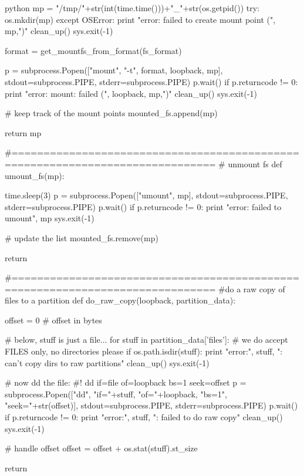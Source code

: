 \begin{code-block}{python}
    mp = "/tmp/"+str(int(time.time()))+"_"+str(os.getpid())
    try:
        os.mkdir(mp)
    except OSError:
        print "error: failed to create mount point (", mp,")"
        clean_up()
        sys.exit(-1)

    format = get_mountfs_from_format(fs_format)

    p = subprocess.Popen(["mount", "-t", format, loopback, mp],
                         stdout=subprocess.PIPE, stderr=subprocess.PIPE)
    p.wait()
    if p.returncode != 0:
        print "error: mount: failed (", loopback, mp,")"
        clean_up()
        sys.exit(-1)

    # keep track of the mount points
    mounted_fs.append(mp)

    return mp

#==============================================================================
# unmount fs
def umount_fs(mp):

    time.sleep(3)
    p = subprocess.Popen(["umount", mp],
                         stdout=subprocess.PIPE, stderr=subprocess.PIPE)
    p.wait()
    if p.returncode != 0:
        print "error: failed to umount", mp
        sys.exit(-1)

    # update the list
    mounted_fs.remove(mp)

    return

#==============================================================================
#do a raw copy of files to a partition
def do_raw_copy(loopback, partition_data):

    offset = 0  # offset in bytes

    # below, stuff is just a file...
    for stuff in partition_data['files']:
        # we do accept FILES only, no directories please
        if os.path.isdir(stuff):
            print "error:", stuff, ": can't copy dirs to raw partitions"
            clean_up()
            sys.exit(-1)

        # now dd the file:
        #! dd if=file of=loopback bs=1 seek=offset
        p = subprocess.Popen(["dd", "if="+stuff, "of="+loopback, "bs=1",
                             "seek="+str(offset)],
                             stdout=subprocess.PIPE, stderr=subprocess.PIPE)
        p.wait()
        if p.returncode != 0:
            print "error:", stuff, ": failed to do raw copy"
            clean_up()
            sys.exit(-1)

        # handle offset
        offset = offset + os.stat(stuff).st_size

    return


\end{code-block}

